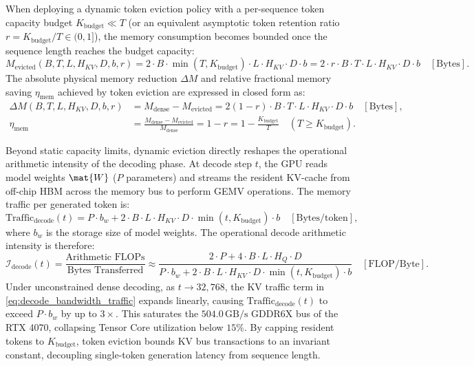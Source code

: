 When deploying a dynamic token eviction policy with a per-sequence token capacity budget $K_{\text{budget}} \ll T$ (or an equivalent asymptotic token retention ratio $r = K_{\text{budget}} / T \in (0, 1]$), the memory consumption becomes bounded once the sequence length reaches the budget capacity:
\begin{equation}
\label{eq:evicted_kv_footprint_exact}
M_{\text{evicted}}(B, T, L, H_{KV}, D, b, r) = 2 \cdot B \cdot \min(T, K_{\text{budget}}) \cdot L \cdot H_{KV} \cdot D \cdot b = 2 \cdot r \cdot B \cdot T \cdot L \cdot H_{KV} \cdot D \cdot b \quad [\text{Bytes}].
\end{equation}
The absolute physical memory reduction $\Delta M$ and relative fractional memory saving $\eta_{\text{mem}}$ achieved by token eviction are expressed in closed form as:
\begin{align}
\label{eq:delta_kv_memory}
\Delta M(B, T, L, H_{KV}, D, b, r) &= M_{\text{dense}} - M_{\text{evicted}} = 2 (1 - r) \cdot B \cdot T \cdot L \cdot H_{KV} \cdot D \cdot b \quad [\text{Bytes}], \\
\label{eq:eta_kv_memory}
\eta_{\text{mem}} &= \frac{M_{\text{dense}} - M_{\text{evicted}}}{M_{\text{dense}}} = 1 - r = 1 - \frac{K_{\text{budget}}}{T} \quad (T \ge K_{\text{budget}}).
\end{align}

Beyond static capacity limits, dynamic eviction directly reshapes the operational arithmetic intensity of the decoding phase. At decode step $t$, the GPU reads model weights $\mat{W}$ ($P$ parameters) and streams the resident KV-cache from off-chip HBM across the memory bus to perform GEMV operations. The memory traffic per generated token is:
\begin{equation}
\label{eq:decode_bandwidth_traffic}
\text{Traffic}_{\text{decode}}(t) = P \cdot b_w + 2 \cdot B \cdot L \cdot H_{KV} \cdot D \cdot \min(t, K_{\text{budget}}) \cdot b \quad [\text{Bytes/token}],
\end{equation}
where $b_w$ is the storage size of model weights. The operational decode arithmetic intensity is therefore:
\begin{equation}
\label{eq:decode_operational_intensity}
\mathcal{I}_{\text{decode}}(t) = \frac{\text{Arithmetic FLOPs}}{\text{Bytes Transferred}} \approx \frac{2 \cdot P + 4 \cdot B \cdot L \cdot H_Q \cdot D}{P \cdot b_w + 2 \cdot B \cdot L \cdot H_{KV} \cdot D \cdot \min(t, K_{\text{budget}}) \cdot b} \quad [\text{FLOP/Byte}].
\end{equation}
Under unconstrained dense decoding, as $t \to 32{,}768$, the KV traffic term in \cref{eq:decode_bandwidth_traffic} expands linearly, causing $\text{Traffic}_{\text{decode}}(t)$ to exceed $P \cdot b_w$ by up to $3\times$. This saturates the $504.0\,\text{GB/s}$ GDDR6X bus of the RTX 4070, collapsing Tensor Core utilization below $15\%$. By capping resident tokens to $K_{\text{budget}}$, token eviction bounds KV bus transactions to an invariant constant, decoupling single-token generation latency from sequence length.

